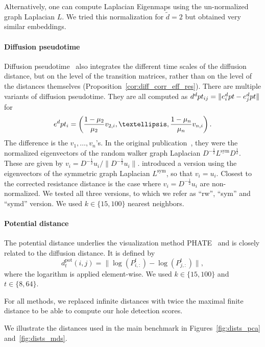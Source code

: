 \documentclass{article}
\newcommand{\lsym}{L^{\text{sym}}}
\theoremstyle{plain}
\theoremstyle{definition}
\theoremstyle{remark}
\begin{document}
Alternatively, one can compute Laplacian Eigenmaps using the un-normalized graph Laplacian $L$. We tried this normalization for $\tilde{d}=2$ but obtained very similar embeddings. 


\paragraph{Diffusion pseudotime} Diffusion pseudotime~\citep{haghverdi2016diffusion} also integrates the different time scales of the diffusion distance, but on the level of the transition matrices, rather than on the level of the distances themselves (Proposition~\ref{cor:diff_corr_eff_res}). There are multiple variants of diffusion pseudotime. They are all computed as  $ d^\textnormal{dpt}_{ij} = \| e_i^\textnormal{dpt} - e_j^\textnormal{dpt}\|$ for 
    \begin{align}
        e^\textnormal{dpt}_i = \left(\frac{1-\mu_2}{\mu_2} v_{2,i}, \dots,\frac{1-\mu_n}{\mu_n} v_{n,i} \right).
    \end{align}
The difference is the $v_1, \dots, v_n$'s. In the original publication~\citep{haghverdi2016diffusion}, they were the normalized eigenvectors of the random walker graph Laplacian $D^{-\frac{1}{2}}\lsym D^\frac{1}{2}$. These are given by $v_i = D^{-\frac{1}{2}}u_i  / \|D^{-\frac{1}{2}}u_i\|$. \citet{wolf2019paga} introduced a version using the eigenvectors of the symmetric graph Laplacian $\lsym$, so that $v_i= u_i$. Closest to the corrected resistance distance is the case where $v_i =D^{-\frac{1}{2}}u_i$ are non-normalized. We tested all three versions, to which we refer as ``rw'', ``sym'' and ``symd'' version. We used $k\in\{15, 100\}$ nearest neighbors.

\paragraph{Potential distance} The potential distance underlies the visualization method PHATE~\citep{moon2019visualizing} and is closely related to the diffusion distance. It is defined by 
$$d_t^{\text{pot}}(i, j) = \| \log(P^t_{i, :}) - \log(P^t_{j,:})\|,$$
where the logarithm is applied element-wise. We used $k\in\{15, 100\}$ and $t\in\{8, 64\}$.


For all methods, we replaced infinite distances with twice the maximal finite distance to be able to compute our hole detection scores.

We illustrate the distances used in the main benchmark in Figures~\ref{fig:dists_pca} and~\ref{fig:dists_mds}.
\end{document}
